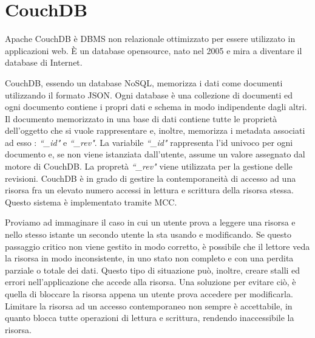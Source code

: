 \newpage
\section{CouchDB}
Apache \ac{CouchDB} è \ac{DBMS} 
non relazionale ottimizzato per essere utilizzato in applicazioni web. È un
database opensource, nato nel 2005 e mira a diventare il database di Internet.

\ac{CouchDB}, essendo un database \ac{NoSQL}, memorizza i dati come documenti
utilizzando il formato \ac{JSON}.
Ogni database è una collezione di documenti ed ogni documento contiene i propri
dati e schema in modo indipendente dagli altri. Il documento memorizzato in una
base di dati contiene tutte le proprietà dell'oggetto che si vuole rappresentare
e, inoltre, memorizza i metadata associati ad esso :
\emph{``\_id"} e \emph{``\_rev"}. La variabile \emph{``\_id"} rappresenta l'id univoco
per ogni documento e, se non viene istanziata dall'utente, assume un valore assegnato
dal motore di CouchDB.
La propretà \emph{``\_rev"} viene utilizzata per la gestione delle revisioni.
\ac{CouchDB} è in grado di gestire la contemporaneità di accesso ad una risorsa
fra un elevato numero accessi in lettura e scrittura della risorsa stessa. Questo
sistema è implementato tramite \ac{MCC}.

Proviamo ad immaginare il caso in cui un utente prova a leggere una risorsa e
nello stesso istante un secondo utente la sta usando e modificando. Se questo
passaggio critico non viene gestito in modo corretto, è possibile che il lettore
veda la risorsa in modo inconsistente, in uno stato non completo e con una
perdita parziale o totale dei dati. Questo tipo di situazione può, inoltre,
creare stalli ed errori nell'applicazione che accede alla risorsa.
Una soluzione per evitare ciò, è quella di bloccare la risorsa appena un utente
prova accedere per modificarla. Limitare la risorsa ad un accesso contemporaneo
non sempre è accettabile, in quanto blocca tutte operazioni di lettura e
scrittura, rendendo inaccessibile la risorsa.

